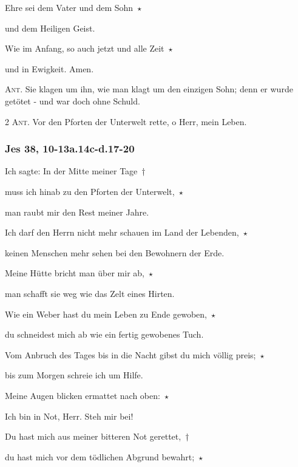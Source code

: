 \noindent Ehre sei dem Vater und dem Sohn~$\star$~\nopagebreak

und dem Heiligen Geist.

\noindent Wie im Anfang, so auch jetzt und alle Zeit~$\star$~\nopagebreak

und in Ewigkeit. Amen.

\vspace{10pt}

\noindent \textsc{Ant.} Sie klagen um ihn, wie man klagt um den einzigen Sohn; denn er wurde getötet - und war doch ohne Schuld.


\newpage

\noindent \textsc{2 Ant.} Vor den Pforten der Unterwelt rette, o Herr, mein Leben.

\subsubsection{Jes 38, 10-13a.14c-d.17-20}

\noindent Ich sagte: In der Mitte meiner Tage~†~\nopagebreak

muss ich hinab zu den Pforten der Unterwelt,~$\star$~\nopagebreak

man raubt mir den Rest meiner Jahre.

\noindent Ich darf den Herrn nicht mehr schauen im Land der Lebenden,~$\star$~\nopagebreak

keinen Menschen mehr sehen bei den Bewohnern der Erde.

\noindent Meine Hütte bricht man über mir ab,~$\star$~\nopagebreak

man schafft sie weg wie das Zelt eines Hirten. 

\noindent Wie ein Weber hast du mein Leben zu Ende gewoben,~$\star$~\nopagebreak

du schneidest mich ab wie ein fertig gewobenes Tuch. 

\noindent Vom Anbruch des Tages bis in die Nacht gibst du mich völlig preis;~$\star$~\nopagebreak

bis zum Morgen schreie ich um Hilfe.

\noindent Meine Augen blicken ermattet nach oben:~$\star$~\nopagebreak

Ich bin in Not, Herr. Steh mir bei!

\noindent Du hast mich aus meiner bitteren Not gerettet,~†~\nopagebreak

du hast mich vor dem tödlichen Abgrund bewahrt;~$\star$~\nopagebreak

